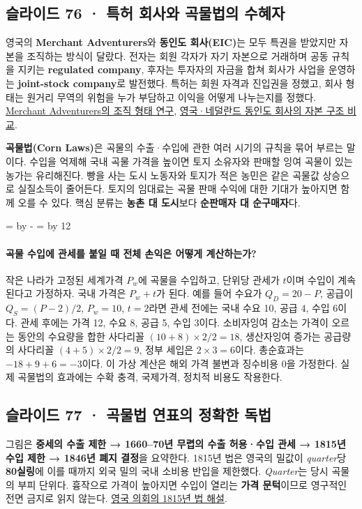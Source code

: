 \documentclass[10pt,a4paper]{article}
\newcommand{\ReserveQuestionSpace}{%
  \par\begingroup
  \dimen0=\pagegoal \advance\dimen0 by -\pagetotal
  \dimen2=\baselineskip \multiply\dimen2 by 12
  \ifdim\dimen0<\dimen2 \newpage\fi
  \endgroup}
\begin{document}
\subsection{슬라이드 76 · 특허 회사와 곡물법의 수혜자}
영국의 \textbf{Merchant Adventurers}와 \textbf{동인도 회사(EIC)}는 모두 특권을 받았지만 자본을 조직하는 방식이 달랐다. 전자는 회원 각자가 자기 자본으로 거래하며 공동 규칙을 지키는 \textbf{regulated company}, 후자는 투자자의 자금을 합쳐 회사가 사업을 운영하는 \textbf{joint-stock company}로 발전했다. 특허는 회원 자격과 진입권을 정했고, 회사 형태는 원거리 무역의 위험을 누가 부담하고 이익을 어떻게 나누는지를 정했다. \href{https://academic.oup.com/reference/62416/reference-article-abstract/555929983}{Merchant Adventurers의 조직 형태 연구}, \href{https://www.cambridge.org/core/books/abs/rise-of-merchant-empires/dutch-and-english-east-india-companies-compared-evidence-from-the-stock-and-foreign-exchange-markets/9DBCE67E60FEBAFA8CD85B02DFFE28D0}{영국·네덜란드 동인도 회사의 자본 구조 비교}.\par

\textbf{곡물법(Corn Laws)}은 곡물의 수출·수입에 관한 여러 시기의 규칙을 묶어 부르는 말이다. 수입을 억제해 국내 곡물 가격을 높이면 토지 소유자와 판매할 잉여 곡물이 있는 농가는 유리해진다. 빵을 사는 도시 노동자와 토지가 적은 농민은 같은 곡물값 상승으로 실질소득이 줄어든다. 토지의 임대료는 곡물 판매 수익에 대한 기대가 높아지면 함께 오를 수 있다. 핵심 분류는 \textbf{농촌 대 도시}보다 \textbf{순판매자 대 순구매자}다.\par

\ReserveQuestionSpace
\paragraph{곡물 수입에 관세를 붙일 때 전체 손익은 어떻게 계산하는가?}
작은 나라가 고정된 세계가격 $P_w$에 곡물을 수입하고, 단위당 관세가 $t$이며 수입이 계속된다고 가정하자. 국내 가격은 $P_w+t$가 된다. 예를 들어 수요가 $Q_D=20-P$, 공급이 $Q_S=(P-2)/2$, $P_w=10$, $t=2$라면 관세 전에는 국내 수요 10, 공급 4, 수입 6이다. 관세 후에는 가격 12, 수요 8, 공급 5, 수입 3이다. 소비자잉여 감소는 가격이 오르는 동안의 수요량을 합한 사다리꼴 $(10+8)\times2/2=18$, 생산자잉여 증가는 공급량의 사다리꼴 $(4+5)\times2/2=9$, 정부 세입은 $2\times3=6$이다. 총순효과는 $-18+9+6=-3$이다. 이 가상 계산은 해외 가격 불변과 징수비용 0을 가정한다. 실제 곡물법의 효과에는 수확 충격, 국제가격, 정치적 비용도 작용한다.\par

\subsection{슬라이드 77 · 곡물법 연표의 정확한 독법}
그림은 \textbf{중세의 수출 제한 → 1660–70년 무렵의 수출 허용·수입 관세 → 1815년 수입 제한 → 1846년 폐지 결정}을 요약한다. 1815년 법은 영국의 밀값이 \emph{quarter}당 \textbf{80실링}에 이를 때까지 외국 밀의 국내 소비용 반입을 제한했다. \emph{Quarter}는 당시 곡물의 부피 단위다. 흉작으로 가격이 높아지면 수입이 열리는 \textbf{가격 문턱}이므로 영구적인 전면 금지로 읽지 않는다. \href{https://committees.parliament.uk/committee/326/petitions-committee/news/99040/petitions-and-the-corn-laws/}{영국 의회의 1815년 법 해설}.\par
\end{document}
